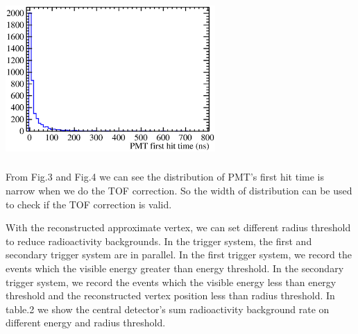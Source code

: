 \documentclass[a4paper,10pt,twoside]{paper_1}
\begin{document}
\begin{multicols}{2}
		\begin{center}
			\includegraphics[width=8cm,height=6cm]{4MeV_e+_PMT_first_hitTime_corrected.eps}
		\end{center}


		From Fig.3 and Fig.4 we can see the distribution of PMT's first hit time is narrow
		when we do the TOF correction. So the width of distribution can be used to check if 
		the TOF correction is valid.


		With the reconstructed approximate vertex, we can
		set different radius threshold to reduce radioactivity
		backgrounds. In the trigger system, the first and secondary trigger system are in parallel. 
		In the first trigger system, we record the events which the visible energy
		greater than energy threshold. In the secondary trigger system, 
		we record the events which the visible energy less than energy threshold 
		and the reconstructed vertex position less than radius threshold.
		In table.2 we show the central detector's sum radioactivity background rate
		on different energy and radius threshold.


	\end{multicols}
\end{document}
